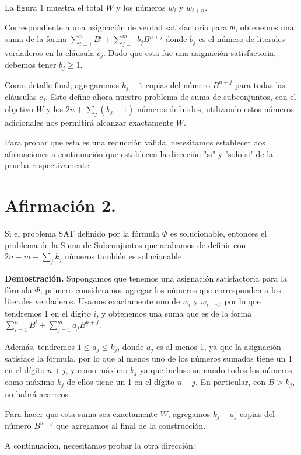 \documentclass{article}
\begin{document}
La figura 1 muestra el total \( W \) y los números \( w_i \) y \( w_{i+n} \).

Correspondiente a una asignación de verdad satisfactoria para \( \Phi \), obtenemos una suma de la forma \( \sum_{i=1}^{n} B^i + \sum_{j=1}^{m} b_j B^{n+j} \) donde \( b_j \) es el número de literales verdaderos en la cláusula \( c_j \). Dado que esta fue una asignación satisfactoria, debemos tener \( b_j \geq 1 \).

Como detalle final, agregaremos \( k_j - 1 \) copias del número \( B^{n+j} \) para todas las cláusulas \( c_j \). Esto define ahora nuestro problema de suma de subconjuntos, con el objetivo \( W \) y los \( 2n + \sum_{j} (k_j - 1) \) números definidos, utilizando estos números adicionales nos permitirá alcanzar exactamente \( W \).

Para probar que esta es una reducción válida, necesitamos establecer dos afirmaciones a continuación que establecen la dirección "si" y "solo si" de la prueba respectivamente.

\section{Afirmación 2.} Si el problema SAT definido por la fórmula \( \Phi \) es solucionable, entonces el problema de la Suma de Subconjuntos que acabamos de definir con \( 2n - m + \sum_{j} k_j \) números también es solucionable.

\textbf{Demostración.} Supongamos que tenemos una asignación satisfactoria para la fórmula \( \Phi \), primero consideramos agregar los números que corresponden a los literales verdaderos. Usamos exactamente uno de \( w_i \) y \( w_{i+n} \), por lo que tendremos 1 en el dígito \( i \), y obtenemos una suma que es de la forma \( \sum_{i=1}^{n} B^i + \sum_{j=1}^{m} a_j B^{n+j} \).

Además, tendremos \( 1 \leq a_j \leq k_j \), donde \( a_j \) es al menos 1, ya que la asignación satisface la fórmula, por lo que al menos uno de los números sumados tiene un 1 en el dígito \( n+j \), y como máximo \( k_j \) ya que incluso sumando todos los números, como máximo \( k_j \) de ellos tiene un 1 en el dígito \( n+j \). En particular, con \( B > k_j \), no habrá acarreos.

Para hacer que esta suma sea exactamente \( W \), agregamos \( k_j - a_j \) copias del número \( B^{n+j} \) que agregamos al final de la construcción.

A continuación, necesitamos probar la otra dirección:
\end{document}
